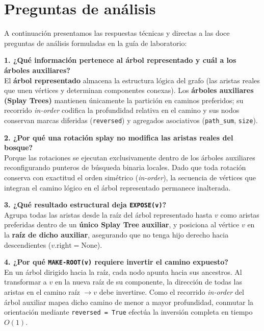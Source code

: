 \section{Preguntas de análisis}

A continuación presentamos las respuestas técnicas y directas a las doce preguntas de análisis formuladas en la guía de laboratorio:

\smallskip
\noindent\textbf{1. ¿Qué información pertenece al árbol representado y cuál a los árboles auxiliares?}\\
El \textbf{árbol representado} almacena la estructura lógica del grafo (las aristas reales que unen vértices y determinan componentes conexas). Los \textbf{árboles auxiliares (Splay Trees)} mantienen únicamente la partición en caminos preferidos; su recorrido \textit{in-order} codifica la profundidad relativa en el camino y sus nodos conservan marcas diferidas (\texttt{reversed}) y agregados asociativos (\texttt{path\_sum}, \texttt{size}).

\smallskip
\noindent\textbf{2. ¿Por qué una rotación splay no modifica las aristas reales del bosque?}\\
Porque las rotaciones se ejecutan exclusivamente dentro de los árboles auxiliares reconfigurando punteros de búsqueda binaria locales. Dado que toda rotación conserva con exactitud el orden simétrico (\textit{in-order}), la secuencia de vértices que integran el camino lógico en el árbol representado permanece inalterada.

\smallskip
\noindent\textbf{3. ¿Qué resultado estructural deja \texttt{EXPOSE(v)}?}\\
Agrupa todas las aristas desde la raíz del árbol representado hasta $v$ como aristas preferidas dentro de un \textbf{único Splay Tree auxiliar}, y posiciona al vértice $v$ en la \textbf{raíz de dicho auxiliar}, asegurando que no tenga hijo derecho hacia descendientes ($v.\text{right} = \text{None}$).

\smallskip
\noindent\textbf{4. ¿Por qué \texttt{MAKE-ROOT(v)} requiere invertir el camino expuesto?}\\
En un árbol dirigido hacia la raíz, cada nodo apunta hacia sus ancestros. Al transformar a $v$ en la nueva raíz de su componente, la dirección de todas las aristas en el camino raíz $\to v$ debe invertirse. Como el recorrido \textit{in-order} del árbol auxiliar mapea dicho camino de menor a mayor profundidad, conmutar la orientación mediante \texttt{reversed = True} efectúa la inversión completa en tiempo $O(1)$.

